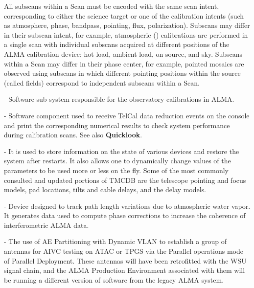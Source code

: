 \begin{description}
All subscans within a Scan must be encoded with the same scan intent, corresponding to either the science target or one of the calibration intents (such as atmosphere, phase, bandpass, pointing, flux, polarization). Subscans may differ in their subscan intent, for example, atmospheric (\Tsys) calibrations are performed in a single scan with individual subscans acquired at different positions of the ALMA calibration device: hot load, ambient load, on-source, and sky. Subscans within a Scan may differ in their phase center, for example, pointed mosaics are observed using subscans in which different pointing positions within the source (called fields) correspond to independent subscans within a Scan.

\item [TelCal] - Software sub-system responsible for the observatory calibrations in ALMA.

\item[TelCal Spy] - Software component used to receive TelCal data reduction events on the console and print the corresponding numerical results to check system performance during calibration scans. See also \textbf{Quicklook}.

\item [Telescope Monitoring \& Control Database (TMCDB)] - It is used to store information on the state of various devices and restore the system after restarts. It also allows one to dynamically change values of the parameters to be used more or less on the fly. Some of the most commonly consulted and updated portions of TMCDB are the telescope pointing and focus models, pad locations, tilts and cable delays, and the delay models.

\item[Water Vapor Radiometer (WVR)] - Device designed to track path length variations due to atmospheric water vapor. It generates data used to compute phase corrections to increase the coherence of interferometric ALMA data.
\item[WSU Test System] - The use of AE Partitioning with Dynamic VLAN to establish a group
of antennas for AIVC testing on ATAC or TPGS via the Parallel operations mode of Parallel Deployment.  These antennas will have been retrofitted with the WSU signal chain, and the ALMA Production Environment associated with them will be running a different version of software from the legacy ALMA system. 
\end{description}

